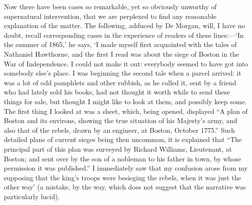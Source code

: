 \documentclass[letterpaper,12pt,oneside,openany]{memoir}
\begin{document}
Now there have been cases so remarkable, yet so
obviously unworthy of supernatural intervention, that
we are perplexed to find any reasonable explanation of
the matter. The following, adduced by De Morgan,
will, I have no doubt, recall corresponding cases in
the experience of readers of these lines:---`In the
summer of 1865,' he says, `I made myself first acquainted
with the tales of Nathaniel Hawthorne, and
the first I read was about the siege of Boston in the
War of Independence. I could not make it out:
everybody seemed to have got into somebody else's
place. I was beginning the second tale when a parcel
arrived: it was a lot of odd pamphlets and other
rubbish, as he called it, sent by a friend who had lately
sold his books, had not thought it worth while to send
these things for sale, but thought I might like to look
at them, and possibly keep some. The first thing I
looked at was a sheet, which, being opened, displayed
``A plan of Boston and its environs, showing the true
situation of his Majesty's army, and also that of the
rebels, drawn by an engineer, at Boston, October 1775.''
Such detailed plans of current sieges being then uncommon,
it is explained that ``The principal part of
this plan was surveyed by Richard Williams, Lieutenant,
at Boston; and sent over by the son of a nobleman
to his father in town, by whose permission it was
published.'' I immediately saw that my confusion
arose from my supposing that the king's troops were
besieging the rebels, when it was just the other way'
(a mistake, by the way, which does not suggest that the
narrative was particularly lucid).
\end{document}
